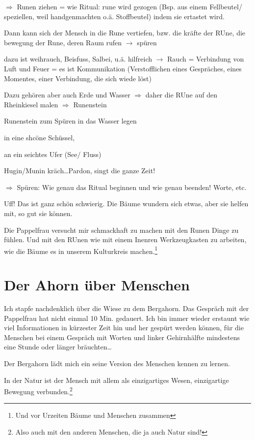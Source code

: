 \documentclass[11pt,titlepage,a5paper]{book}
\begin{document}
$\Rightarrow$ Runen ziehen = wie Ritual: rune wird gezogen (Bsp. aus einem Fellbeutel/ speziellen, weil handgenmachten o.ä. Stoffbeutel) indem sie ertastet wird.

Dann kann sich der Mensch in die Rune vertiefen, bzw. die kräfte der RUne, die bewegung der Rune, deren Raum rufen $\rightarrow$ spüren

dazu ist weihrauch, Beisfuss, Salbei, u.ä. hilfreich $\rightarrow$ Rauch = Verbindung von Luft und Feuer = es ist Kommunikation (Verstofflichen eines Gespräches, eines Momentes, einer Verbindung, die sich wiede löst)

Dazu gehören aber auch Erde und Wasser $\Rightarrow$ daher die RUne auf den Rheinkiesel malen $\Rightarrow$ Runenstein

Runenstein zum Spüren in das Wasser legen

in eine shcöne Schüssel,

an ein seichtes Ufer (See/ Fluss)

Hugin/Munin kräch\dots Pardon, singt die ganze Zeit! 

$\Rightarrow$ Spüren: Wie genau das Ritual beginnen und wie genau beenden! Worte, etc.

Uff! Das ist ganz schön schwierig. Die Bäume wundern sich etwas, aber sie helfen mit, so gut sie können. 

Die Pappelfrau versucht mir schmackhaft zu machen mit den Runen Dinge zu fühlen. Und mit den RUnen wie mit einem Inenren Werkzeugkasten zu arbeiten, wie die Bäume es in unserem Kulturkreis machen.\footnote{Und vor Urzeiten Bäume und Menschen zusammen}


\section*{Der Ahorn über Menschen  }

Ich stapfe nachdenklich über die Wiese zu dem Bergahorn. Das Gespräch mit der Pappelfrau hat nicht einmal 10 Min. gedauert. Ich bin immer wieder erstaunt wie viel Informationen in kürzester Zeit hin und her gespürt werden können, für die Menschen bei einem Gespräch mit Worten und linker Gehirnhälfte mindestens eine Stunde oder länger bräuchten\dots

Der Bergahorn lädt mich ein seine Version des Menschen kennen zu lernen. 

In der Natur ist der Mensch mit allem als einzigartiges Wesen, einzigartige Bewegung verbunden.\footnote{Also auch mit den anderen Menschen, die ja auch Natur sind!}
\end{document}
